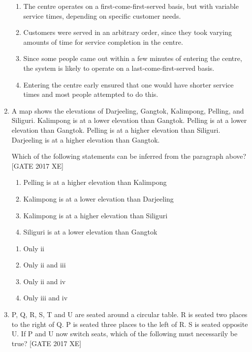 \documentclass[journal,12pt,onecolumn]{IEEEtran}
\theoremstyle{remark}
\begin{document}
\begin{enumerate}
\begin{enumerate}
    \item The centre operates on a first-come-first-served basis, but with variable service times, depending on specific customer needs.
    \item Customers were served in an arbitrary order, since they took varying amounts of time for service completion in the centre.
    \item Since some people came out within a few minutes of entering the centre, the system is likely to operate on a last-come-first-served basis.
    \item Entering the centre early ensured that one would have shorter service times and most people attempted to do this.
\end{enumerate}



\item A map shows the elevations of Darjeeling, Gangtok, Kalimpong, Pelling, and Siliguri. Kalimpong is at a lower elevation than Gangtok. Pelling is at a lower elevation than Gangtok. Pelling is at a higher elevation than Siliguri. Darjeeling is at a higher elevation than Gangtok.

Which of the following statements can be inferred from the paragraph above?
 \hfill [GATE 2017 XE]
\begin{enumerate}[label=\roman*.]
    \item Pelling is at a higher elevation than Kalimpong
    \item Kalimpong is at a lower elevation than Darjeeling
    \item Kalimpong is at a higher elevation than Siliguri
    \item Siliguri is at a lower elevation than Gangtok
\end{enumerate}

\begin{multicols}{4}
\begin{enumerate}
    \item Only ii
    \item Only ii and iii
    \item Only ii and iv
    \item Only iii and iv
\end{enumerate}
\end{multicols}



\item P, Q, R, S, T and U are seated around a circular table. R is seated two places to the right of Q. P is seated three places to the left of R. S is seated opposite U. If P and U now switch seats, which of the following must necessarily be true?
 \hfill [GATE 2017 XE]
 

\end{enumerate}
\end{document}
